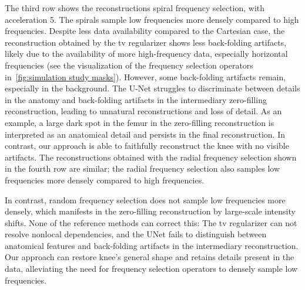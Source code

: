 The third row shows the reconstructions spiral frequency selection, with acceleration \num{5}.
The spirals sample low frequencies more densely compared to high frequencies.
Despite less data availability compared to the Cartesian case, the reconstruction obtained by the \gls{tv} regularizer shows less back-folding artifacts, likely due to the availability of more high-frequency data, especially horizontal frequencies (see the visualization of the frequency selection operators in~\cref{fig:simulation study masks}).
However, some back-folding artifacts remain, especially in the background.
The U-Net struggles to discriminate between details in the anatomy and back-folding artifacts in the intermediary zero-filling reconstruction, leading to unnatural reconstructions and loss of detail.
As an example, a large dark spot in the femur in the zero-filling reconstruction is interpreted as an anatomical detail and persists in the final reconstruction.
In contrast, our approach is able to faithfully reconstruct the knee with no visible artifacts.
The reconstructions obtained with the radial frequency selection shown in the fourth row are similar;
the radial frequency selection also samples low frequencies more densely compared to high frequencies.

In contrast, random frequency selection does not sample low frequencies more densely, which manifests in the zero-filling reconstruction by large-scale intensity shifts.
None of the reference methods can correct this:
The \gls{tv} regularizer can not resolve nonlocal dependencies, and the UNet fails to distinguish between anatomical features and back-folding artifacts in the intermediary reconstruction.
Our approach can restore knee's general shape and retains details present in the data, alleviating the need for frequency selection operators to densely sample low frequencies.

